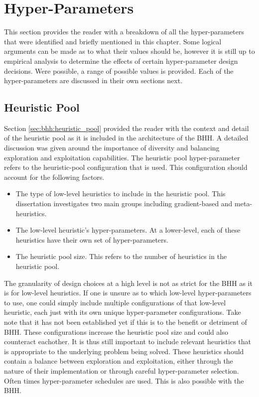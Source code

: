 \section{Hyper-Parameters}
\label{sec:bhh:hyper_parameters}

This section provides the reader with a breakdown of all the hyper-parameters that were identified and briefly mentioned in this chapter. Some logical arguments can be made as to what their values should be, however it is still up to empirical analysis to determine the effects of certain hyper-parameter design decisions. Were possible, a range of possible values is provided. Each of the hyper-parameters are discussed in their own sections next.

\subsection{Heuristic Pool}
\label{sec:bhh:hyper_parameters:heuristic_pool}

Section \ref{sec:bhh:heuristic_pool} provided the reader with the context and detail of the heuristic pool as it is included in the architecture of the \ac{BHH}. A detailed discussion was given around the importance of diversity and balancing exploration and exploitation capabilities. The heuristic pool hyper-parameter refers to the heuristic-pool configuration that is used. This configuration should account for the following factors.

\begin{itemize}
      \item The type of low-level heuristics to include in the heuristic pool. This dissertation investigates two main groups including gradient-based and meta-heuristics.
      \item The low-level heuristic's hyper-parameters. At a lower-level, each of these heuristics have their own set of hyper-parameters.
      \item The heuristic pool size. This refers to the number of heuristics in the heuristic pool.
\end{itemize}

The granularity of design choices at a high level is not as strict for the \ac{BHH} as it is for low-level heuristics. If one is unsure as to which low-level hyper-parameters to use, one could simply include multiple configurations of that low-level heuristic, each just with its own unique hyper-parameter configurations. Take note that it has not been established yet if this is to the benefit or detriment of \ac{BHH}. These configurations increase the heuristic pool size and could also counteract eachother.  It is thus still important to include relevant heuristics that is appropriate to the underlying problem being solved. These heuristics should contain a balance between exploration and exploitation, either through the nature of their implementation or through careful hyper-parameter selection. Often times hyper-parameter schedules are used. This is also possible with the \ac{BHH}.


